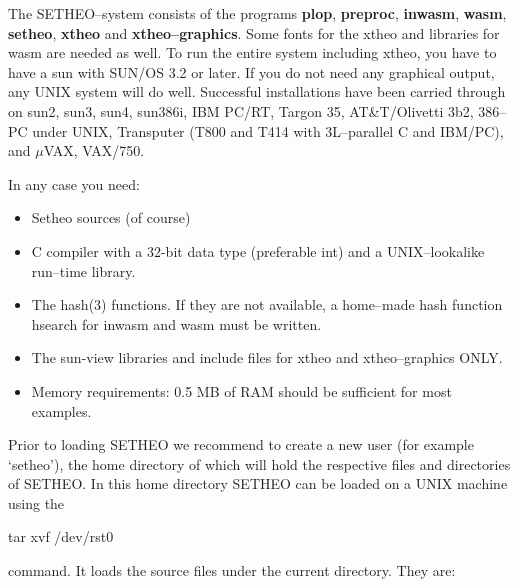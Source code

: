 The SETHEO--system consists of the programs
{\bf plop},
{\bf preproc},
{\bf inwasm},
{\bf wasm},
{\bf setheo},
{\bf xtheo} and
{\bf xtheo--graphics}.
Some fonts for the xtheo and libraries for wasm are needed as well.
To run the entire system including xtheo, you have to have a sun
with SUN/OS 3.2 or later.
If you do not need any graphical output, any UNIX system will do well.
Successful installations have been carried through on sun2, sun3, sun4,
sun386i, IBM PC/RT, Targon 35, AT\&T/Olivetti 3b2, 386--PC under UNIX,
Transputer (T800 and T414 with 3L--parallel C and IBM/PC), and
$\mu$VAX, VAX/750.

In any case you need:
\begin{itemize}
\item
Setheo sources (of course)
\item
C compiler with a 32-bit data type (preferable int) and a
UNIX--lookalike run--time library.
\item
The hash(3) functions. If they are not available, a home--made
hash function hsearch for inwasm and wasm must be written.
\item
The sun-view libraries and include files for xtheo and xtheo--graphics ONLY.
\item
Memory requirements: 0.5 MB of RAM should be sufficient for most examples.
\end{itemize}


Prior to loading SETHEO we recommend to create a new user (for example 
`setheo'), the home directory of which will hold the respective files 
and directories of SETHEO.
In this home directory SETHEO can be loaded on a UNIX machine using the

\vspace{-2mm}
\begin{center}
              tar xvf /dev/rst0
\end{center}
\vspace{-2mm}
command. It loads the source files under the current
directory.
They are:
\\[3mm]

